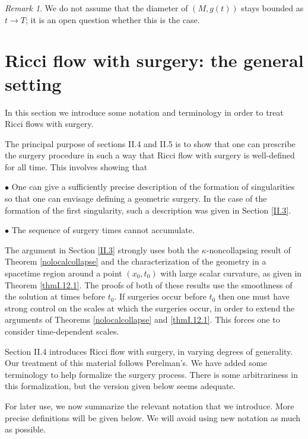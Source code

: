 \documentclass[12pt]{amsart}
\numberwithin{equation}{section}
\theoremstyle{plain}
\theoremstyle{definition}
\theoremstyle{remark}
\newtheorem{remark}[equation]{Remark}
\begin{document}
\begin{remark}
We do not assume that
the diameter of $(M, g(t))$ stays bounded as $t \rightarrow T$;
it is an open question whether this is the case.
\end{remark}

\section{Ricci flow with surgery:
the general setting}
\label{Ricci flow with surgery}

In this section we introduce some notation and terminology in order to
treat Ricci flows with surgery.

The principal purpose of sections II.4 and II.5 is to show that
one can prescribe the surgery procedure in such a way that Ricci flow
with surgery is well-defined for all time.  This involves showing
that 

$\bullet$ One can give a sufficiently precise description of 
the formation of singularities so that one can envisage defining a geometric
surgery.
In the case of the formation of the first singularity, 
such a description was given in Section \ref{II.3}. 

$\bullet$ The sequence of surgery times cannot accumulate.

\noindent
The argument in Section \ref{II.3} strongly uses both the $\kappa$-noncollapsing
result
of Theorem \ref{nolocalcollapse} and the characterization
of the geometry in a spacetime region around a point $(x_0, t_0)$ with
large scalar curvature, as given in Theorem \ref{thmI.12.1}.  
The proofs of both of these results use the 
smoothness of the solution at times before $t_0$. If surgeries occur
before $t_0$ then one must have strong control on the scales at which the
surgeries occur, in order to extend the arguments of Theorems
\ref{nolocalcollapse} and \ref{thmI.12.1}.
This forces one to consider time-dependent scales.
    
Section II.4 introduces Ricci flow with surgery, in varying degrees of 
generality. Our treatment of this material follows Perelman's.
We have added some terminology to help formalize the surgery process.
There is some arbitrariness in this formalization, but the version given
below seems adequate.
 
For later  use, we now summarize the relevant notation
that we introduce.  More precise  definitions will be given below.
We will avoid using new notation as much as possible. 
\end{document}
